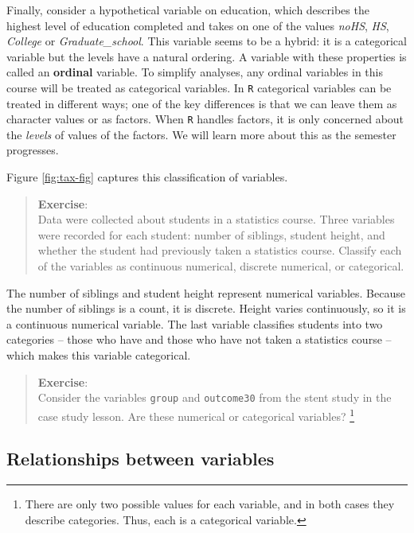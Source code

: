 \documentclass[
]{book}
\begin{document}
Finally, consider a hypothetical variable on education, which describes the highest level of education completed and takes on one of the values \emph{noHS}, \emph{HS}, \emph{College} or \emph{Graduate\_school}. This variable seems to be a hybrid: it is a categorical variable but the levels have a natural ordering. A variable with these properties is called an \textbf{ordinal} variable. To simplify analyses, any ordinal variables in this course will be treated as categorical variables. In \texttt{R} categorical variables can be treated in different ways; one of the key differences is that we can leave them as character values or as factors. When \texttt{R} handles factors, it is only concerned about the \emph{levels} of values of the factors. We will learn more about this as the semester progresses.

Figure \ref{fig:tax-fig} captures this classification of variables.

\begin{quote}
\textbf{Exercise}:\\
Data were collected about students in a statistics course. Three variables were recorded for each student: number of siblings, student height, and whether the student had previously taken a statistics course. Classify each of the variables as continuous numerical, discrete numerical, or categorical.
\end{quote}

The number of siblings and student height represent numerical variables. Because the number of siblings is a count, it is discrete. Height varies continuously, so it is a continuous numerical variable. The last variable classifies students into two categories -- those who have and those who have not taken a statistics course -- which makes this variable categorical.

\begin{quote}
\textbf{Exercise}:\\
Consider the variables \texttt{group} and \texttt{outcome30} from the stent study in the case study lesson. Are these numerical or categorical variables? \footnote{There are only two possible values for each variable, and in both cases they describe categories. Thus, each is a categorical variable.}
\end{quote}

\hypertarget{relationships-between-variables}{%
\subsection{Relationships between variables}\label{relationships-between-variables}}
\end{document}
